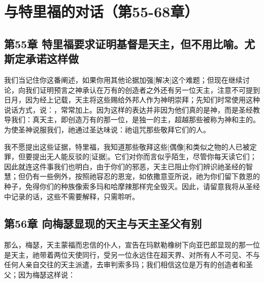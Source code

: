 

\section{与特里福的对话（第55-68章）}


\subsection{第55章 特里福要求证明基督是天主，但不用比喻。尤斯定承诺这样做}

 我们当记住你这番阐述，如果你用其他论据加强[解决]这个难题；但现在继续讨论，向我们证明预言之神承认在万有的创造者之外还有另一位天主，注意不可提到日月，因为经上记载，天主将这些赐给外邦人作为神明崇拜；先知们时常使用这种说话方式，说：，常常加上。因为这样的表达并非因为他们真的是神，而是圣经教导我们：真天主，即创造万有的那一位，是独一的主，超越那些被称为神和主的。为使圣神说服我们，祂通过圣达味说：祂诅咒那些敬拜它们的人。\par

 我不愿提出这些证据，特里福，我知道那些敬拜这些[偶像]和类似之物的人已被定罪，但要提出无人能反驳的[证据]。它们对你而言似乎陌生，尽管你每天读它们；因此就连这件事我们也明白，由于你们的邪恶，天主已阻止你们辨识祂圣经的智慧；但仍有一些例外，按照祂容忍的恩宠，如依撒意亚所说，祂为你们留下救恩的种子，免得你们的种族像索多玛和哈摩辣那样完全毁灭。因此，请留意我将从圣经中记录的话，这些不需要解释，只需聆听。\par


\subsection{第56章 向梅瑟显现的天主与天主圣父有别}

 那么，梅瑟，天主蒙福而忠信的仆人，宣告在玛默勒橡树下向亚巴郎显现的那一位是天主，祂带着两位天使同行，受另一位永远住在超天界、对所有人不可见、不与任何人亲自交往的天主派遣，去审判索多玛；我们相信这位是万有的创造者和圣父；因为梅瑟这样说：   \par

